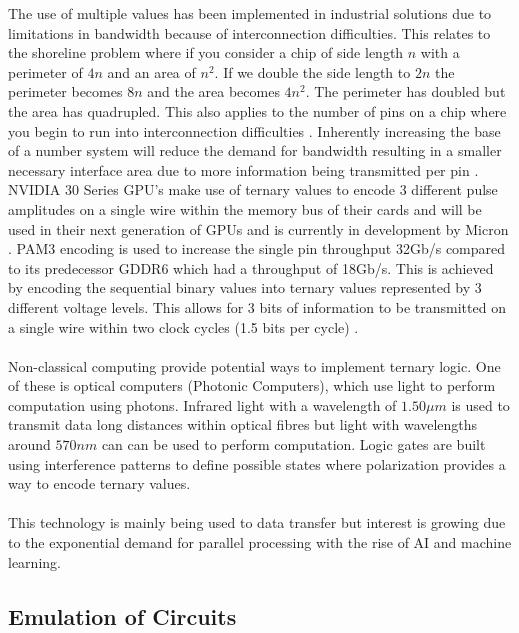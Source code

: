 \documentclass[12pt]{article}
\begin{document}
The use of multiple values has been implemented in industrial solutions due to limitations in bandwidth because of interconnection difficulties. 
This relates to the shoreline problem where if you consider a chip of side length $n$ with a perimeter 
of $4n$ and an area of $n^{2}$. If we double the side length to $2n$ the perimeter becomes $8n$ and the area becomes $4n^{2}$. The perimeter 
has doubled but the area has quadrupled. This also applies to the number of pins on a chip where you begin to run into interconnection 
difficulties \citep{zahoor2024design}. 
Inherently increasing the base of a number system will reduce the demand for bandwidth resulting in a smaller necessary interface area 
due to more information being transmitted per pin \citep{zahoor2024design}.
\\
NVIDIA 30 Series GPU's make use of ternary values to encode 3 different pulse amplitudes on a single wire within the memory bus of their cards 
and will be used in their next generation of GPUs and is currently in development by Micron \citep{micron2024gddr7}.
PAM3 encoding is used to increase the single pin throughput 32Gb/s compared to its predecessor GDDR6 which had a throughput of 18Gb/s. This 
is achieved by encoding the sequential binary values into ternary values represented by 3 different voltage levels. This allows for 3 bits 
of information to be transmitted on a single wire within two clock cycles (1.5 bits per cycle) \citep{micron2024gddr7} \citep{nam2024low}.\\
\\
Non-classical computing provide potential ways to implement ternary logic. One of these is optical computers 
(Photonic Computers), which use light to perform computation using photons. 
Infrared light with a wavelength of $1.50\mu m$ is used to transmit data long distances within optical fibres but 
light with wavelengths around $570nm$ can can be used to perform computation. Logic gates are built using interference 
patterns to define possible states where polarization provides a way to encode ternary values.\\
\\
This technology is mainly being used to data transfer but interest is growing due to the exponential demand for 
parallel processing with the rise of AI and machine learning.\\

\subsection{Emulation of Circuits}
\end{document}
